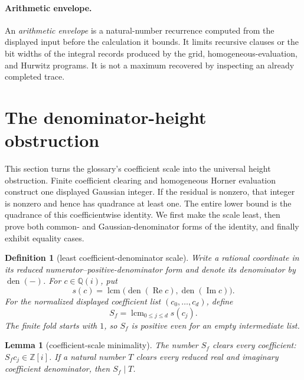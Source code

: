 \documentclass[11pt]{article}
\newtheorem{lemma}[lemma]{Lemma}
\newtheorem{definition}[definition]{Definition}
\newcommand{\Qi}{\mathbb{Q}(i)}
\newcommand{\Zi}{\mathbb{Z}[i]}
\newcommand{\Ree}{\operatorname{Re}}
\newcommand{\Imm}{\operatorname{Im}}
\begin{document}
\paragraph{Arithmetic envelope.}
An \emph{arithmetic envelope} is a natural-number recurrence computed from
the displayed input before the calculation it bounds.  It limits recursive
clauses or the bit widths of the integral records produced by the grid,
homogeneous-evaluation, and Hurwitz programs.  It is not a maximum recovered
by inspecting an already completed trace.

\section{The denominator-height obstruction}
\label{sec:lower}

This section turns the glossary's coefficient scale into the universal
height obstruction.  Finite coefficient clearing and homogeneous Horner
evaluation construct one displayed Gaussian integer.  If the residual is
nonzero, that integer is nonzero and hence has quadrance at least one.  The
entire lower bound is the quadrance of this coefficientwise identity.  We
first make the scale least, then prove both common- and Gaussian-denominator
forms of the identity, and finally exhibit equality cases.

\begin{definition}[least coefficient-denominator scale]
\label{def:least-coefficient-scale}
Write a rational coordinate in its reduced numerator--positive-denominator
form and denote its denominator by $\operatorname{den}(-)$.  For
$c\in\Qi$, put
\[
 s(c)=\operatorname{lcm}\bigl(\operatorname{den}(\Ree c),
                              \operatorname{den}(\Imm c)\bigr).
\]
For the normalized displayed coefficient list $(c_0,\ldots,c_d)$, define
\begin{equation}
\label{eq:least-coefficient-scale}
                     S_f=\operatorname{lcm}_{0\le j\le d}s(c_j).
\end{equation}
The finite fold starts with $1$, so $S_f$ is positive even for an empty
intermediate list.
\end{definition}

\begin{lemma}[coefficient-scale minimality]
\label{lem:coefficient-scale-minimal}
The number $S_f$ clears every coefficient: $S_fc_j\in\Zi$.  If a natural
number $T$ clears every reduced real and imaginary coefficient denominator,
then $S_f\mid T$.
\end{lemma}
\end{document}
